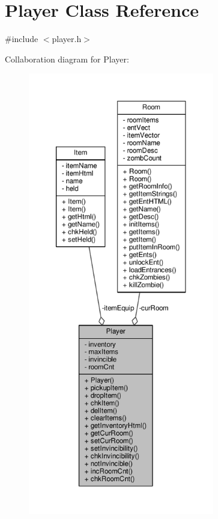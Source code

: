 \hypertarget{class_player}{}\section{Player Class Reference}
\label{class_player}


{\ttfamily \#include $<$player.\+h$>$}



Collaboration diagram for Player\+:
\nopagebreak
\begin{figure}[H]
\begin{center}
\leavevmode
\includegraphics[height=550pt]{class_player__coll__graph}
\end{center}
\end{figure}
